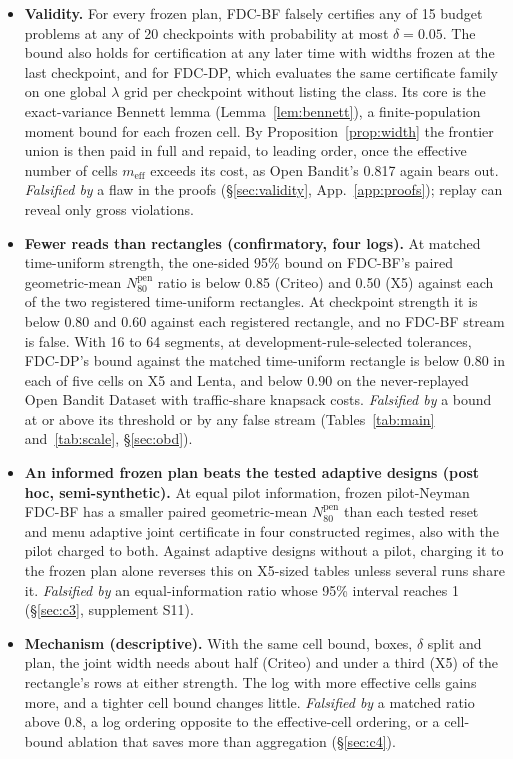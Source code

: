 \documentclass[sigconf,anonymous,review]{acmart}
\newcommand{\Npen}{N_{80}^{\text{pen}}}
\newcommand{\meff}{m_{\text{eff}}}
\begin{document}
\begin{itemize}
\item[\textbf{C1}] \textbf{Validity.} For every frozen plan, FDC-BF falsely certifies any of 15 budget problems at any of 20 checkpoints with probability at most $\delta = 0.05$. The bound also holds for certification at any later time with widths frozen at the last checkpoint, and for FDC-DP, which evaluates the same certificate family on one global $\lambda$ grid per checkpoint without listing the class. Its core is the exact-variance Bennett lemma (Lemma~\ref{lem:bennett}), a finite-population moment bound for each frozen cell. By Proposition~\ref{prop:width} the frontier union is then paid in full and repaid, to leading order, once the effective number of cells $\meff$ exceeds its cost, as Open Bandit's 0.817 again bears out. \emph{Falsified by} a flaw in the proofs (\S\ref{sec:validity}, App.~\ref{app:proofs}); replay can reveal only gross violations.
\item[\textbf{C2}] \textbf{Fewer reads than rectangles (confirmatory, four logs).} At matched time-uniform strength, the one-sided 95\% bound on FDC-BF's paired geometric-mean $\Npen$ ratio is below 0.85 (Criteo) and 0.50 (X5) against each of the two registered time-uniform rectangles. At checkpoint strength it is below 0.80 and 0.60 against each registered rectangle, and no FDC-BF stream is false. With 16 to 64 segments, at development-rule-selected tolerances, FDC-DP's bound against the matched time-uniform rectangle is below 0.80 in each of five cells on X5 and Lenta, and below 0.90 on the never-replayed Open Bandit Dataset with traffic-share knapsack costs. \emph{Falsified by} a bound at or above its threshold or by any false stream (Tables~\ref{tab:main} and~\ref{tab:scale}, \S\ref{sec:obd}).
\item[\textbf{C3}] \textbf{An informed frozen plan beats the tested adaptive designs (post hoc, semi-synthetic).} At equal pilot information, frozen pilot-Neyman FDC-BF has a smaller paired geometric-mean $\Npen$ than each tested reset and menu adaptive joint certificate in four constructed regimes, also with the pilot charged to both. Against adaptive designs without a pilot, charging it to the frozen plan alone reverses this on X5-sized tables unless several runs share it. \emph{Falsified by} an equal-information ratio whose 95\% interval reaches 1 (\S\ref{sec:c3}, supplement S11).
\item[\textbf{C4}] \textbf{Mechanism (descriptive).} With the same cell bound, boxes, $\delta$ split and plan, the joint width needs about half (Criteo) and under a third (X5) of the rectangle's rows at either strength. The log with more effective cells gains more, and a tighter cell bound changes little. \emph{Falsified by} a matched ratio above 0.8, a log ordering opposite to the effective-cell ordering, or a cell-bound ablation that saves more than aggregation (\S\ref{sec:c4}).
\end{itemize}
\end{document}
